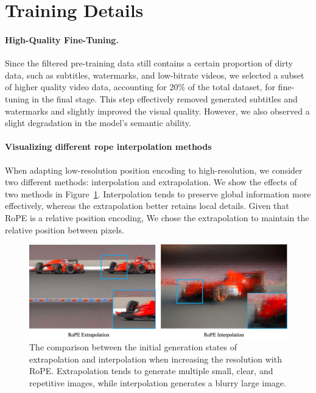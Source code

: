 \section{Training Details}

\paragraph{High-Quality Fine-Tuning.}
Since the filtered pre-training data still contains a certain proportion of dirty data, such as subtitles, watermarks, and low-bitrate videos, we selected a subset of higher quality video data, accounting for 20\% of the total dataset, for fine-tuning in the final stage. This step effectively removed generated subtitles and watermarks and slightly improved the visual quality. However, we also observed a slight degradation in the model's semantic ability.

\paragraph{Visualizing different rope interpolation methods}
When adapting low-resolution position encoding to high-resolution, we consider two different methods: interpolation and extrapolation. We show the effects of two methods in Figure~\ref{fig:ive}. Interpolation tends to preserve global information more effectively, whereas the extrapolation better retains local details. Given that RoPE is a relative position encoding, We chose the extrapolation to maintain the relative position between pixels. 
\begin{figure}[h]
\begin{center}
\includegraphics[width=0.7\linewidth]{images/ive.jpg}
\end{center}
\caption{The comparison between the initial generation states of extrapolation and interpolation when increasing the resolution with RoPE. Extrapolation tends to generate multiple small, clear, and repetitive images, while interpolation generates a blurry large image.}
\label{fig:ive}
\end{figure}

\vspace{-2em}
